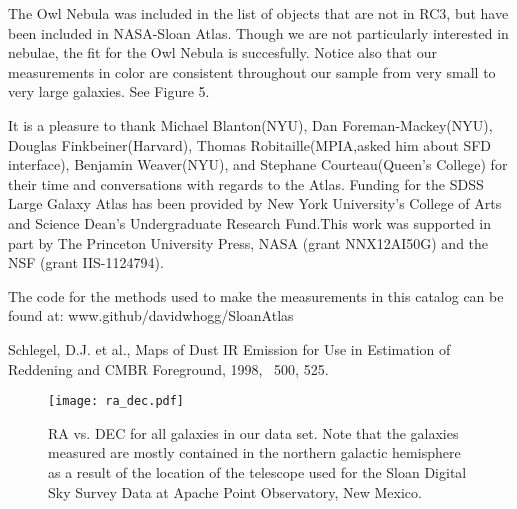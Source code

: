 \documentclass[12pt,preprint,pdftex]{aastex}
\begin{document}
The Owl Nebula was included in the list of objects that are not in RC3, but have been included in NASA-Sloan Atlas. Though we are not particularly interested in nebulae, the fit for the Owl Nebula is succesfully. Notice also that our measurements in color are consistent throughout our sample from very small to very large galaxies. See Figure 5. 


\acknowledgements
It is a pleasure to thank Michael Blanton(NYU), Dan Foreman-Mackey(NYU), Douglas Finkbeiner(Harvard), Thomas Robitaille(MPIA,asked him about SFD interface), Benjamin Weaver(NYU), and Stephane Courteau(Queen's College) for their time and conversations with regards to the Atlas. Funding for the SDSS Large Galaxy Atlas has been provided by New York University's College of Arts and Science Dean's Undergraduate Research Fund.This work was supported in part by The Princeton University Press,
NASA (grant NNX12AI50G) and the NSF (grant IIS-1124794).



The code for the methods used to make the measurements in this catalog can be found at: www.github/davidwhogg/SloanAtlas

\begin{thebibliography}{}
 {Schlegel, D.J. et al., Maps of Dust IR Emission for Use in Estimation of Reddening and CMBR Foreground, 1998, \apj~500, 525.}
\end{thebibliography}
\clearpage

\begin{figure}
\centering
\texttt{[image: ra\_dec.pdf]}
\caption{RA vs. DEC for all galaxies in our data set. Note that the galaxies measured are mostly contained in the northern galactic hemisphere as a result of the location of the telescope used for the Sloan Digital Sky Survey Data at Apache Point Observatory, New Mexico.}
\end{figure}
\end{document}
